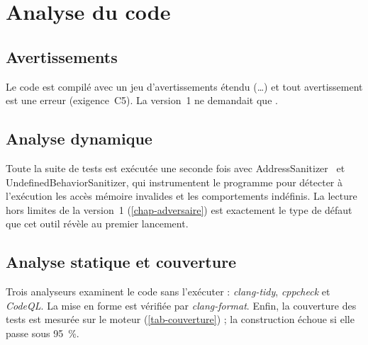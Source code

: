\section{Analyse du code}

\subsection{Avertissements}

Le code est compilé avec un jeu d'avertissements étendu (\dots) et tout avertissement est
une erreur (exigence~C5). La version~1 ne demandait que .

\subsection{Analyse dynamique}
\label{sec-sanitizers}

Toute la suite de tests est exécutée une seconde fois avec
AddressSanitizer~\cite{serebryany2012} et UndefinedBehaviorSanitizer, qui instrumentent le
programme pour détecter à l'exécution les accès mémoire invalides et les comportements
indéfinis. La lecture hors limites de la version~1 (\cref{chap-adversaire}) est exactement
le type de défaut que cet outil révèle au premier lancement.

\subsection{Analyse statique et couverture}

Trois analyseurs examinent le code sans l'exécuter : \emph{clang-tidy}, \emph{cppcheck} et
\emph{CodeQL}. La mise en forme est vérifiée par \emph{clang-format}. Enfin, la couverture
des tests est mesurée sur le moteur (\cref{tab-couverture}) ; la construction échoue si
elle passe sous \SI{95}{\percent}.

